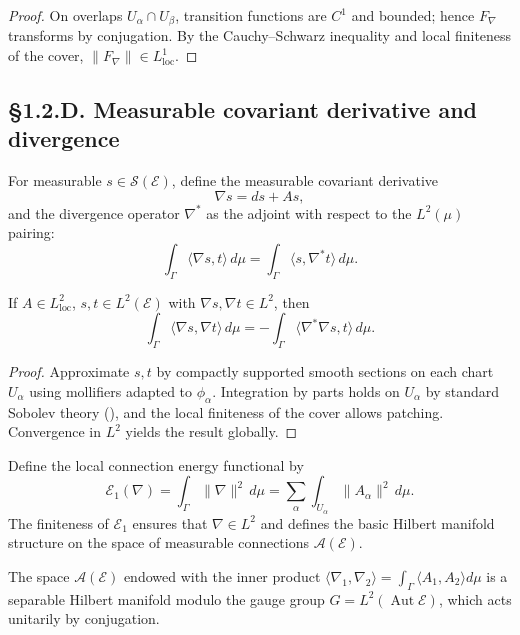\begin{proof}
On overlaps $U_\alpha\cap U_\beta$, transition functions are $C^1$ and bounded; hence $F_\nabla$ transforms by conjugation. 
By the Cauchy–Schwarz inequality and local finiteness of the cover, $\|F_\nabla\|\in L^1_{\mathrm{loc}}$.
\end{proof}

\subsection*{§1.2.D. Measurable covariant derivative and divergence}

For measurable $s\in\mathcal{S}(\mathcal{E})$, define the measurable covariant derivative
\[
\nabla s = ds + A s,
\]
and the divergence operator $\nabla^\ast$ as the adjoint with respect to the $L^2(\mu)$ pairing:
\[
\int_\Gamma \langle\nabla s,t\rangle\,d\mu
=\int_\Gamma \langle s,\nabla^\ast t\rangle\,d\mu.
\]

\begin{lemma}\label{lem:1.2.ibp}
If $A\in L^2_{\mathrm{loc}}$, $s,t\in L^2(\mathcal E)$ with $\nabla s,\nabla t\in L^2$, then
\[
\int_\Gamma \langle\nabla s,\nabla t\rangle\,d\mu
= -\int_\Gamma \langle\nabla^\ast\nabla s,t\rangle\,d\mu.
\]
\end{lemma}

\begin{proof}
Approximate $s,t$ by compactly supported smooth sections on each chart $U_\alpha$ using mollifiers adapted to $\phi_\alpha$. 
Integration by parts holds on $U_\alpha$ by standard Sobolev theory (\cite{TaylorPDE1}), and the local finiteness of the cover allows patching. 
Convergence in $L^2$ yields the result globally.
\end{proof}

\begin{definition}
Define the local connection energy functional by
\[
\mathcal{E}_1(\nabla)=\int_\Gamma \|\nabla\|^2\,d\mu
=\sum_\alpha \int_{U_\alpha} \|A_\alpha\|^2\,d\mu.
\]
The finiteness of $\mathcal{E}_1$ ensures that $\nabla\in L^2$ and defines the basic Hilbert manifold structure on the space of measurable connections $\mathcal{A}(\mathcal E)$.
\end{definition}

\begin{remark}
The space $\mathcal{A}(\mathcal E)$ endowed with the inner product 
$\langle\nabla_1,\nabla_2\rangle = \int_\Gamma \langle A_1,A_2\rangle d\mu$
is a separable Hilbert manifold modulo the gauge group $G=L^2(\operatorname{Aut}\mathcal E)$, which acts unitarily by conjugation.
\end{remark}

